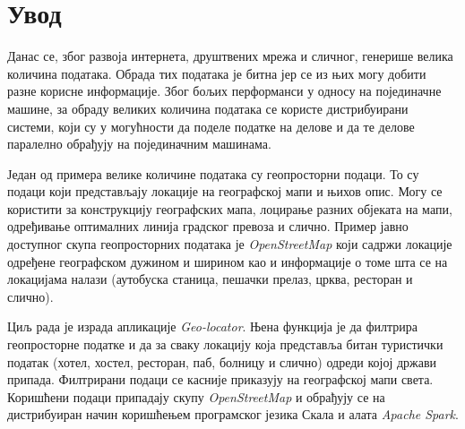 \documentclass[12pt,oneside]{memoir}
\begin{document}
\frontmatter
\naslovna
\komisija
\apstrakt
\tableofcontents*

\mainmatter


\chapter{Увод}
\label{chp:uvod}

Данас се, због развоја интернета, друштвених мрежа и сличног, генерише велика количина података. Обрада тих података је битна јер се из њих могу добити разне корисне информације. Због бољих перформанси у односу на појединачне машине, за обраду великих количина података се користе дистрибуирани системи, који су у могућности да поделе податке на делове и да те делове паралелно обрађују на појединачним машинама.

Један од примера велике количине података су геопросторни подаци. То су подаци који представљају локације на географској мапи и њихов опис. Могу се користити за конструкцију географских мапа, лоцирање разних објеката на мапи, одређивање оптималних линија градског превоза и слично. Пример јавно доступног скупа геопросторних података је \textit{OpenStreetMap} који садржи локације одређене географском дужином и ширином као и информације о томе шта се на локацијама налази (аутобуска станица, пешачки прелаз, црква, ресторан и слично).

Циљ рада је израда апликације \textit{Geo-locator}. Њена функција је да филтрира геопросторне податке и да за сваку локацију која представља битан туристички податак (хотел, хостел, ресторан, паб, болницу и слично) одреди којој држави припада. Филтрирани подаци се касније приказују на географској мапи света. Коришћени подаци припадају скупу \textit{OpenStreetMap} и обрађују се на дистрибуиран начин коришћењем програмског језика Скала и алата \textit{Apache Spark}.
\end{document}
